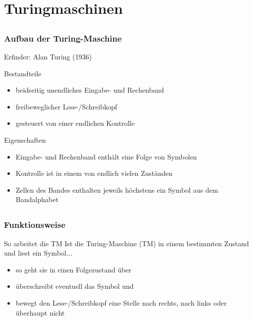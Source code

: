 \section{Turingmaschinen}

\subsection*{}
\begin{frame}
  \frametitle{Aufbau der Turing-Maschine}
  Erfinder: Alan Turing (1936)
  \pause
	\begin{block}{Bestandteile} %
  	\begin{itemize}
      \item beidseitig unendliches Eingabe- und Rechenband
			\item freibeweglicher Lese-/Schreibkopf
			\item gesteuert von einer endlichen Kontrolle
  	\end{itemize}
	\end{block}
	\pause
	\begin{block}{Eigenschaften}
  	\begin{itemize}
	      	\item Eingabe- und Rechenband enthält eine Folge von Symbolen
			\item Kontrolle ist in einem von endlich vielen Zuständen
			\item Zellen des Bandes enthalten jeweils höchstens ein Symbol aus dem Bandalphabet
  	\end{itemize}
	\end{block}
\end{frame}

\subsection*{}
\begin{frame}
\frametitle{Funktionsweise}
	\begin{block}{So arbeitet die TM}
	Ist die Turing-Maschine (TM) in einem bestimmten Zustand und liest ein Symbol...
\begin{itemize}
	\item 	so geht sie in einen Folgezustand über
	\item 	überschreibt eventuell das Symbol und
	\item 	bewegt den Lese-/Schreibkopf eine Stelle nach rechts, nach links oder überhaupt nicht
\end{itemize}
\end{block}
\end{frame}

